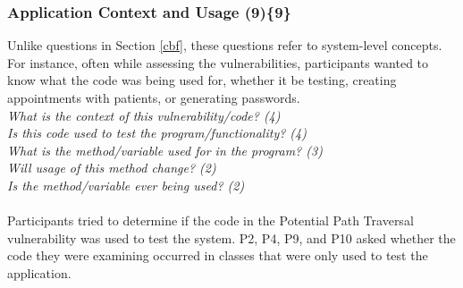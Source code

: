 \documentclass[10pt,journal,compsoc]{IEEEtran}
\begin{document}

% 


\subsubsection{Application Context and Usage (9)\{9\}}\label{acu}

Unlike questions in Section \ref{cbf}, these questions refer to system-level concepts.
For instance, often while assessing the vulnerabilities, participants wanted to know what the code was being used for, whether it be testing, creating appointments with patients, or generating passwords.
\\

\noindent\emph{What is the context of this vulnerability/code? (4)} \\
\emph{Is this code used to test the program/functionality? (4)} \\
\emph{What is the method/variable used for in the program? (3)} \\
\emph{Will usage of this method change? (2)} \\
\emph{Is the method/variable ever being used? (2)} \\
\\


Participants tried to determine if the code in the Potential Path Traversal vulnerability was used to test the system. 
P2, P4, P9, and P10 asked whether the code they were examining occurred in classes that were only used to test the application. 

\end{document}

